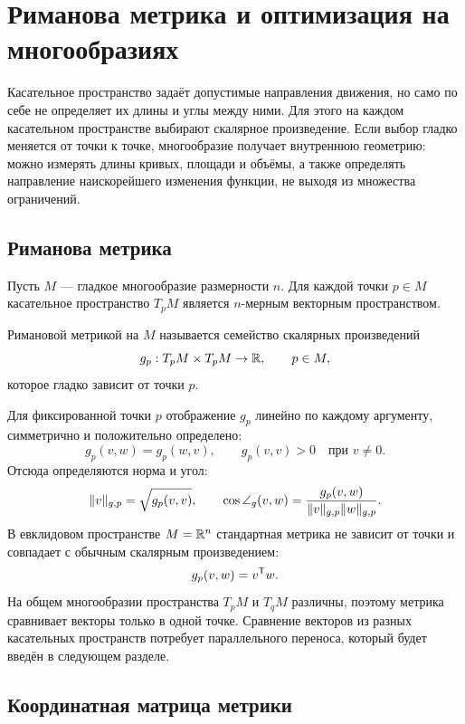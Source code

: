 \section{Риманова метрика и оптимизация на многообразиях}
\label{sec:riemannian-metric-optimization}

Касательное пространство задаёт допустимые направления движения, но само по себе не определяет их длины и углы между ними. Для этого на каждом касательном пространстве выбирают скалярное произведение. Если выбор гладко меняется от точки к точке, многообразие получает внутреннюю геометрию: можно измерять длины кривых, площади и объёмы, а также определять направление наискорейшего изменения функции, не выходя из множества ограничений.

\subsection{Риманова метрика}

Пусть $M$ --- гладкое многообразие размерности $n$. Для каждой точки $p\in M$ касательное пространство $T_pM$ является $n$-мерным векторным пространством.

\begin{definition}
Римановой метрикой на $M$ называется семейство скалярных произведений
\[
g_p:T_pM\times T_pM\to\mathbb{R},
\qquad p\in M,
\]
которое гладко зависит от точки $p$.
\end{definition}

Для фиксированной точки $p$ отображение $g_p$ линейно по каждому аргументу, симметрично и положительно определено:
\begin{equation}
\label{eq:riemannian-metric-properties}
g_p(v,w)=g_p(w,v),
\qquad
g_p(v,v)>0\quad\text{при }v\neq0.
\end{equation}
Отсюда определяются норма и угол:
\begin{equation}
\label{eq:riemannian-norm-angle}
\lVert v\rVert_{g,p}=\sqrt{g_p(v,v)},
\qquad
\cos\angle_g(v,w)
=
\frac{g_p(v,w)}{\lVert v\rVert_{g,p}\lVert w\rVert_{g,p}}.
\end{equation}
В евклидовом пространстве $M=\mathbb{R}^n$ стандартная метрика не зависит от точки и совпадает с обычным скалярным произведением:
\[
g_p(v,w)=v^{\mathsf{T}}w.
\]
На общем многообразии пространства $T_pM$ и $T_qM$ различны, поэтому метрика сравнивает векторы только в одной точке. Сравнение векторов из разных касательных пространств потребует параллельного переноса, который будет введён в следующем разделе.

\subsection{Координатная матрица метрики}

